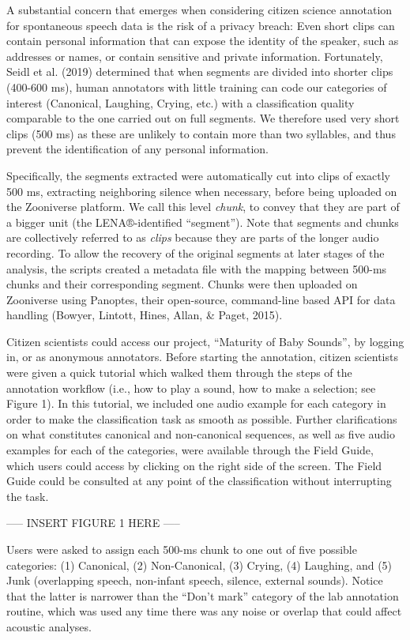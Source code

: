 \documentclass[english,,man]{apa6}
\begin{document}
A substantial concern that emerges when considering citizen science annotation for spontaneous speech data is the risk of a privacy breach: Even short clips can contain personal information that can expose the identity of the speaker, such as addresses or names, or contain sensitive and private information. Fortunately, Seidl et al. (2019) determined that when segments are divided into shorter clips (400-600 ms), human annotators with little training can code our categories of interest (Canonical, Laughing, Crying, etc.) with a classification quality comparable to the one carried out on full segments. We therefore used very short clips (500 ms) as these are unlikely to contain more than two syllables, and thus prevent the identification of any personal information.

Specifically, the segments extracted were automatically cut into clips of exactly 500 ms, extracting neighboring silence when necessary, before being uploaded on the Zooniverse platform. We call this level \emph{chunk}, to convey that they are part of a bigger unit (the LENA®-identified \enquote{segment}). Note that segments and chunks are collectively referred to as \emph{clips} because they are parts of the longer audio recording. To allow the recovery of the original segments at later stages of the analysis, the scripts created a metadata file with the mapping between 500-ms chunks and their corresponding segment. Chunks were then uploaded on Zooniverse using Panoptes, their open-source, command-line based API for data handling (Bowyer, Lintott, Hines, Allan, \& Paget, 2015).

Citizen scientists could access our project, \enquote{Maturity of Baby Sounds}, by logging in, or as anonymous annotators. Before starting the annotation, citizen scientists were given a quick tutorial which walked them through the steps of the annotation workflow (i.e., how to play a sound, how to make a selection; see Figure 1). In this tutorial, we included one audio example for each category in order to make the classification task as smooth as possible. Further clarifications on what constitutes canonical and non-canonical sequences, as well as five audio examples for each of the categories, were available through the Field Guide, which users could access by clicking on the right side of the screen. The Field Guide could be consulted at any point of the classification without interrupting the task.

----- INSERT FIGURE 1 HERE -----

Users were asked to assign each 500-ms chunk to one out of five possible categories: (1) Canonical, (2) Non-Canonical, (3) Crying, (4) Laughing, and (5) Junk (overlapping speech, non-infant speech, silence, external sounds). Notice that the latter is narrower than the \enquote{Don't mark} category of the lab annotation routine, which was used any time there was any noise or overlap that could affect acoustic analyses.
\end{document}
